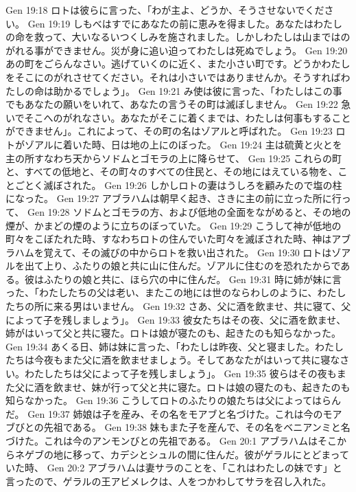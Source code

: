 Gen 19:18  ロトは彼らに言った、「わが主よ、どうか、そうさせないでください。
Gen 19:19  しもべはすでにあなたの前に恵みを得ました。あなたはわたしの命を救って、大いなるいつくしみを施されました。しかしわたしは山まではのがれる事ができません。災が身に追い迫ってわたしは死ぬでしょう。
Gen 19:20  あの町をごらんなさい。逃げていくのに近く、また小さい町です。どうかわたしをそこにのがれさせてください。それは小さいではありませんか。そうすればわたしの命は助かるでしょう」。
Gen 19:21  み使は彼に言った、「わたしはこの事でもあなたの願いをいれて、あなたの言うその町は滅ぼしません。
Gen 19:22  急いでそこへのがれなさい。あなたがそこに着くまでは、わたしは何事もすることができません」。これによって、その町の名はゾアルと呼ばれた。
Gen 19:23  ロトがゾアルに着いた時、日は地の上にのぼった。
Gen 19:24  主は硫黄と火とを主の所すなわち天からソドムとゴモラの上に降らせて、
Gen 19:25  これらの町と、すべての低地と、その町々のすべての住民と、その地にはえている物を、ことごとく滅ぼされた。
Gen 19:26  しかしロトの妻はうしろを顧みたので塩の柱になった。
Gen 19:27  アブラハムは朝早く起き、さきに主の前に立った所に行って、
Gen 19:28  ソドムとゴモラの方、および低地の全面をながめると、その地の煙が、かまどの煙のように立ちのぼっていた。
Gen 19:29  こうして神が低地の町々をこぼたれた時、すなわちロトの住んでいた町々を滅ぼされた時、神はアブラハムを覚えて、その滅びの中からロトを救い出された。
Gen 19:30  ロトはゾアルを出て上り、ふたりの娘と共に山に住んだ。ゾアルに住むのを恐れたからである。彼はふたりの娘と共に、ほら穴の中に住んだ。
Gen 19:31  時に姉が妹に言った、「わたしたちの父は老い、またこの地には世のならわしのように、わたしたちの所に来る男はいません。
Gen 19:32  さあ、父に酒を飲ませ、共に寝て、父によって子を残しましょう」。
Gen 19:33  彼女たちはその夜、父に酒を飲ませ、姉がはいって父と共に寝た。ロトは娘が寝たのも、起きたのも知らなかった。
Gen 19:34  あくる日、姉は妹に言った、「わたしは昨夜、父と寝ました。わたしたちは今夜もまた父に酒を飲ませましょう。そしてあなたがはいって共に寝なさい。わたしたちは父によって子を残しましょう」。
Gen 19:35  彼らはその夜もまた父に酒を飲ませ、妹が行って父と共に寝た。ロトは娘の寝たのも、起きたのも知らなかった。
Gen 19:36  こうしてロトのふたりの娘たちは父によってはらんだ。
Gen 19:37  姉娘は子を産み、その名をモアブと名づけた。これは今のモアブびとの先祖である。
Gen 19:38  妹もまた子を産んで、その名をベニアンミと名づけた。これは今のアンモンびとの先祖である。
Gen 20:1  アブラハムはそこからネゲブの地に移って、カデシとシュルの間に住んだ。彼がゲラルにとどまっていた時、
Gen 20:2  アブラハムは妻サラのことを、「これはわたしの妹です」と言ったので、ゲラルの王アビメレクは、人をつかわしてサラを召し入れた。
